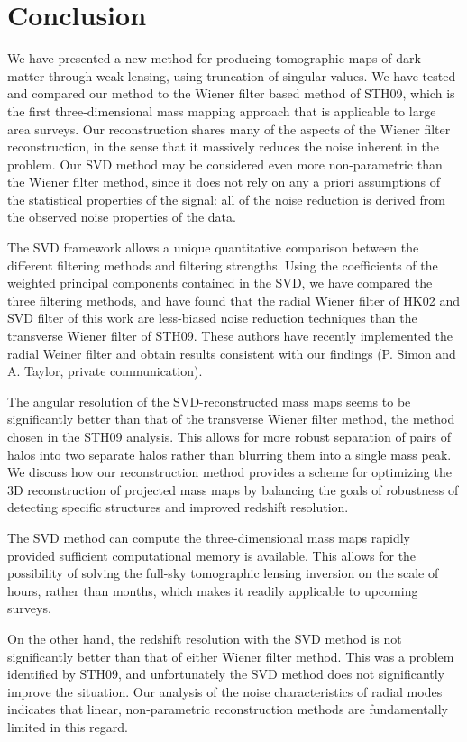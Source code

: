 \section{Conclusion}
\label{Conclusions}

We have presented a new method for producing tomographic maps of dark matter
through weak lensing, using truncation of singular values.  We have
tested and compared our method to the Wiener filter based
method of STH09, which is the first three-dimensional mass mapping
approach that is applicable to large area surveys. Our reconstruction
shares many of the aspects of the Wiener filter reconstruction,
in the sense that it massively reduces the noise inherent in the problem.
Our SVD method may be considered even more non-parametric
than the Wiener filter method, since it does not rely on any a priori 
assumptions of the statistical properties of the signal: all of the noise 
reduction is derived from the observed noise properties of the data.

The SVD framework allows a unique quantitative comparison between the
different filtering methods and filtering strengths.  Using the
coefficients of the weighted principal components contained in the SVD,
we have compared the three filtering methods, and have found that 
the radial Wiener filter of HK02 and SVD filter of this work are 
less-biased noise reduction techniques than the transverse Wiener filter
of STH09.  These authors have recently implemented the radial Weiner 
filter and obtain results consistent with our findings (P. Simon and 
A. Taylor, private communication).

The angular resolution of the SVD-reconstructed mass maps seems to 
be significantly better than that of the transverse Wiener filter method,
the method chosen in the STH09 analysis.
This allows for more robust separation of pairs of halos into two 
separate halos rather than blurring them into a single mass peak.  
We discuss how our reconstruction method provides a scheme for
optimizing the 3D reconstruction of projected mass maps by
balancing the goals of robustness of detecting specific structures
and improved redshift resolution. 

The SVD method can compute the three-dimensional mass maps
rapidly provided sufficient computational memory is available. 
This allows for the possibility of solving the full-sky tomographic
lensing inversion on the scale of hours, rather than months, which
makes it readily applicable to upcoming surveys. 

On the other hand, the redshift resolution with the SVD method is not
significantly  better than that of either Wiener filter method.  
This was a problem identified by STH09, and unfortunately
the SVD method does not significantly improve the situation. 
Our analysis of the noise characteristics of radial modes 
indicates that linear, non-parametric reconstruction methods are
fundamentally limited in this regard.

